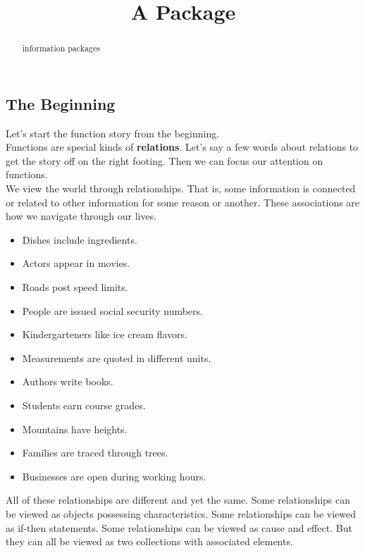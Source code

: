 \documentclass{ximera}
\title{A Package}
\begin{document}
\begin{abstract}
information packages
\end{abstract}
\maketitle





\subsection*{The Beginning}

Let's start the function story from the beginning. \\


Functions are special kinds of \textbf{\textcolor{blue!55!black}{relations}}.  Let's say a few words about relations to get the story off on the right footing.  Then we can focus our attention on functions. \\



We view the world through relationships. That is, some information is connected or related to other information for some reason or another. These associations are how we navigate through our lives.

\begin{itemize}
\item Dishes include ingredients.
\item Actors appear in movies.
\item Roads post speed limits.
\item People are issued social security numbers.
\item Kindergarteners like ice cream flavors.
\item Measurements are quoted in different units.
\item Authors write books.
\item Students earn course grades.
\item Mountains have heights.
\item Families are traced through trees.
\item Businesses are open during working hours.
\end{itemize}


All of these relationships are different and yet the same.  Some relationships can be viewed as objects possessing characteristics. Some relationships can be viewed as if-then statements.  Some relationships can be viewed as cause and effect. But they can all be viewed as two collections with associated elements.
\end{document}
